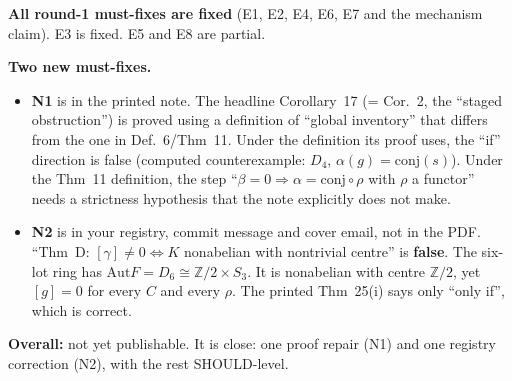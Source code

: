 \documentclass[11pt]{article}
\newcommand{\Z}{\mathbb{Z}}
\newcommand{\Aut}{\mathrm{Aut}}
\begin{document}
\textbf{All round-1 must-fixes are fixed} (E1, E2, E4, E6, E7 and the mechanism claim). E3 is
fixed. E5 and E8 are partial.

\textbf{Two new must-fixes.}
\begin{itemize}[leftmargin=1.2em]
\item \textbf{N1} is in the printed note. The headline Corollary~17 (= Cor.~2, the ``staged
obstruction'') is proved using a definition of ``global inventory'' that differs from the one in
Def.~6/Thm~11. Under the definition its proof uses, the ``if'' direction is false (computed
counterexample: $D_4$, $\alpha(g)=\mathrm{conj}(s)$). Under the Thm~11 definition, the step
``$\beta=0\Rightarrow\alpha=\mathrm{conj}\circ\rho$ with $\rho$ a functor'' needs a strictness
hypothesis that the note explicitly does not make.
\item \textbf{N2} is in your registry, commit message and cover email, not in the PDF. ``Thm~D:
$[\gamma]\neq0\iff K$ nonabelian with nontrivial centre'' is \textbf{false}. The six-lot ring has
$\Aut F=D_6\cong\Z/2\times S_3$. It is nonabelian with centre $\Z/2$, yet $[g]=0$ for every $C$
and every $\rho$. The printed Thm~25(i) says only ``only if'', which is correct.
\end{itemize}

\textbf{Overall:} not yet publishable. It is close: one proof repair (N1) and one registry
correction (N2), with the rest SHOULD-level.
\end{document}
